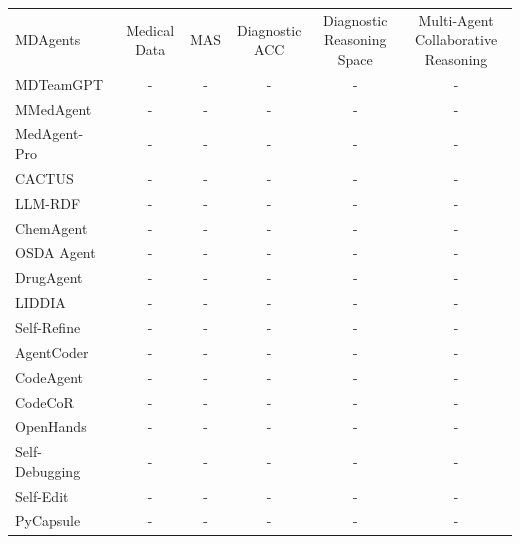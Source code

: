 \begin{table}[t]
{\begin{tabular}{lccccc}
        MDAgents~\citep{kim2024mdagents} & Medical Data & MAS & Diagnostic ACC & Diagnostic Reasoning Space & Multi-Agent Collaborative Reasoning \\

        MDTeamGPT~\citep{chen2025mdteamgpt}& - & - & - & - & - \\

        MMedAgent~\citep{li2024mmedagent}& - & - & - & - & - \\

        MedAgent-Pro~\citep{wang2025medagent}& - & - & - & - & - \\

        CACTUS~\citep{mcnaughton2024cactus}& - & - & - & - & - \\

        LLM-RDF~\citep{m2024augmenting}& - & - & - & - & - \\

        ChemAgent~\citep{tang2025chemagent}& - & - & - & - & - \\

        OSDA Agent~\citep{hu2025osda}& - & - & - & - & - \\

        DrugAgent~\citep{inoue2025drugagent}& - & - & - & - & - \\

        LIDDIA~\citep{averly2025liddia}& - & - & - & - & - \\

        Self-Refine~\citep{madaan2023self}& - & - & - & - & - \\

        AgentCoder~\citep{huang2023agentcoder}& - & - & - & - & - \\

        CodeAgent~\citep{tang2024codeagent}& - & - & - & - & - \\

        CodeCoR~\citep{pan2025codecor}& - & - & - & - & - \\

        OpenHands~\citep{wang2024openhands}& - & - & - & - & - \\

        Self-Debugging~\citep{chen2023teaching}& - & - & - & - & - \\

        Self-Edit~\citep{zhang2023self}& - & - & - & - & - \\

        PyCapsule~\citep{adnan2025large}& - & - & - & - & - \\


\end{tabular}}
\end{table}
